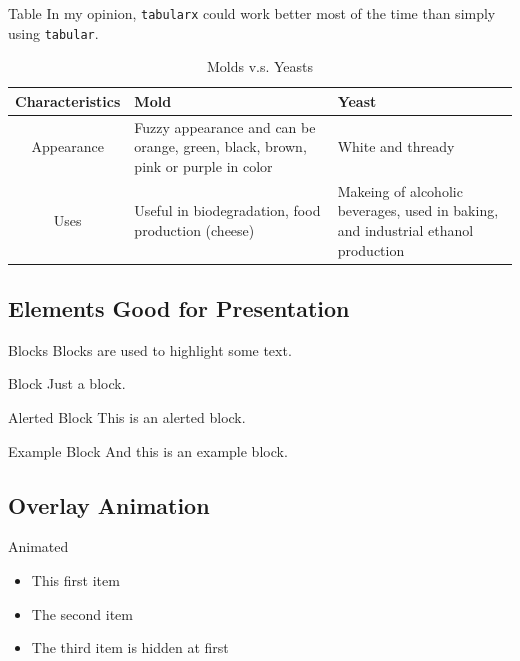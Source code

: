 \documentclass[10pt]{beamer}
\begin{document}
\begin{frame}{Table}
  In my opinion, \texttt{tabularx} could work better most of the time than simply using \texttt{tabular}.
  \begin{table}
    \centering
    \begin{tabularx}{\textwidth}{|c|X|X|}
      \hline
      \textbf{Characteristics} & \textbf{Mold} & \textbf{Yeast} \\ \hline\hline
      Appearance
      & Fuzzy appearance and can be orange, green, black, brown, pink or purple in color
      & White and thready \\ \hline
      Uses
      & Useful in biodegradation, food production (cheese)
      & Makeing of alcoholic beverages, used in baking, and industrial ethanol production \\ \hline
    \end{tabularx}
    \caption{Molds v.s. Yeasts}
    \label{tab:molds-vs-yeasts}
  \end{table}
\end{frame}

\subsection{Elements Good for Presentation}

\begin{frame}{Blocks}
  Blocks are used to highlight some text.
  \begin{block}{Block}
    Just a block.
  \end{block}
  \begin{alertblock}{Alerted Block}
    This is an alerted block.
  \end{alertblock}
  \begin{exampleblock}{Example Block}
    And this is an example block.
  \end{exampleblock}
\end{frame}

\subsection{Overlay Animation}

\begin{frame}{Animated}
  \begin{itemize}
    \item <1-> This first item
    \item <1-> The second item
    \item <2-> The third item is hidden at first
  \end{itemize}
\end{frame}
\end{document}
